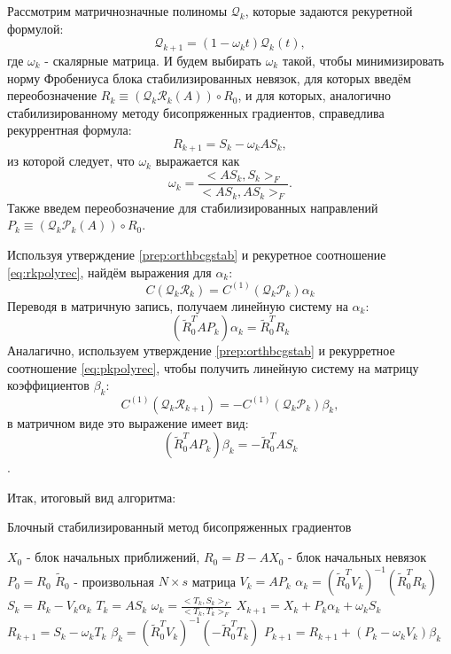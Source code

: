 Рассмотрим матричнозначные полиномы $\mathcal{Q}_k$, которые задаются рекуретной формулой:
\begin{equation*}
    \mathcal{Q}_{k+1} = (1-\omega_k t)\mathcal{Q}_k(t),
\end{equation*}
где $\omega_k$ - скалярные матрица. И будем выбирать $\omega_k$ такой, чтобы минимизировать норму 
Фробениуса блока стабилизированных невязок, для которых введём переобозначение $R_{k} \equiv (\mathcal{Q}_k\mathcal{R}_k(A)) \circ R_0$, и для которых, аналогично стабилизированному методу бисопряженных градиентов, справедлива рекуррентная формула:
$$R_{k+1} =  S_k - \omega_k A S_k,$$
из которой следует, что $\omega_k$ выражается как
 $$\omega_k = \frac{<AS_k,S_k>_F}{<AS_k,AS_k>_F}.$$
Также введем переобозначение для стабилизированных направлений $P_k \equiv (\mathcal{Q}_k \mathcal{P}_k (A)) \circ R_0$.


Используя утверждение \ref{prep:orthbcgstab} и рекуретное соотношение \eqref{eq:rkpolyrec}, 
найдём выражения для $\alpha_k$:
$$C(\mathcal{Q}_k \mathcal{R}_k) = C^{(1)}(\mathcal{Q}_k\mathcal{P}_k)\alpha_k $$
Переводя в матричную запись, получаем линейную систему на $\alpha_k$:
$$(\tilde{R}_0^T AP_k)\alpha_k = \tilde{R}_0^TR_k$$
Аналагично, используем утверждение \ref{prep:orthbcgstab} и рекурретное соотношение \eqref{eq:pkpolyrec}, чтобы получить линейную систему на матрицу коэффициентов $\beta_k$:
$$C^{(1)}(\mathcal{Q}_k\mathcal{R}_{k+1}) = - C^{(1)}(\mathcal{Q}_k \mathcal{P}_k)\beta_k,$$
в матричном виде это выражение имеет вид:
$$(\tilde{R}_0^T A P_k)\beta_k=-\tilde{R}_0^T A S_k$$.

Итак, итоговый вид алгоритма:
\begin{algorithm}[H]
    \caption{Блочный стабилизированный метод бисопряженных градиентов}
    \begin{algorithmic}[1]
        \State $X_0$ - блок начальных приближений, $R_0 = B - AX_0$ - блок начальных невязок
        \State $P_0 = R_0$
        \State $\tilde{R}_0$ - произвольная $N \times s$ матрица
            \State $V_k = AP_k$
            \State $\alpha_k = (\tilde{R}_0^TV_k)^{-1}(\tilde{R}_0^T R_k)$
            \State $S_k = R_k - V_k \alpha_k$
            \State $T_k = A S_k$
            \State $\omega_k = \frac{<T_k,S_k>_F}{<T_k,T_k>_F}$
            \State $X_{k+1} = X_k + P_k \alpha_k + \omega_k S_k$
            \State $R_{k+1} = S_{k} - \omega_k T_k$
            \State $\beta_k = (\tilde{R}_0^T V_k)^{-1}(-\tilde{R}_0^T T_k)$
            \State $P_{k+1} = R_{k+1} + (P_k-\omega_kV_k)\beta_k$
        \EndFor
    \end{algorithmic}
\end{algorithm}

